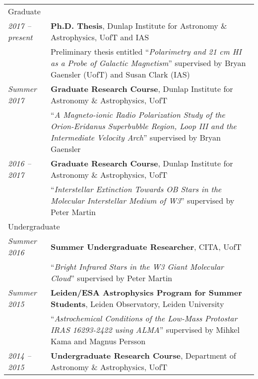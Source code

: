 \documentclass[10pt]{res} %
\begin{document}
\begin{resume}
\begin{table}[h]
\begin{tabularx}{\textwidth}{ @{} p{6.5em} X @{} }
\multicolumn{2}{l}{ \rule{0pt}{3ex} \large \hspace{-12pt} Graduate \dotfill \rule[-1.2ex]{0pt}{0pt}} \\
\textit{2017 -- present} & \textbf{Ph.D. Thesis}, Dunlap Institute for Astronomy \& Astrophysics, UofT and IAS \\
                                & Preliminary thesis entitled ``\textit{Polarimetry and 21 cm HI as a Probe of Galactic Magnetism}'' supervised by Bryan Gaensler (UofT) and Susan Clark (IAS) \\
\textit{Summer 2017} & \textbf{Graduate Research Course}, Dunlap Institute for Astronomy \& Astrophysics, UofT \\
                                   & ``\textit{A Magneto-ionic Radio Polarization Study of the Orion-Eridanus Superbubble Region, Loop III and the Intermediate Velocity Arch}'' supervised by Bryan Gaensler \\
\textit{2016 -- 2017} & \textbf{Graduate Research Course}, Dunlap Institute for Astronomy \& Astrophysics, UofT  \\
                                 & ``\textit{Interstellar Extinction Towards OB Stars in the Molecular Interstellar Medium of W3}'' supervised by Peter Martin \\
\multicolumn{2}{l}{ \rule{0pt}{6.5ex} \large \hspace{-12pt} Undergraduate \dotfill \rule[-1.2ex]{0pt}{0pt}} \\
\textit{Summer 2016} & \textbf{Summer Undergraduate Researcher}, CITA, UofT \\
                                 & ``\textit{Bright Infrared Stars in the W3 Giant Molecular Cloud}'' supervised by Peter Martin \\
\textit{Summer 2015} & \textbf{Leiden/ESA Astrophysics Program for Summer Students}, Leiden Observatory, Leiden University \\
                                 & ``\textit{Astrochemical Conditions of the Low-Mass Protostar IRAS 16293-2422 using ALMA}'' supervised by Mihkel Kama and Magnus Persson \\
\textit{2014 -- 2015} & \textbf{Undergraduate Research Course}, Department of Astronomy \& Astrophysics, UofT \\

\end{tabularx}
\end{table}
\end{resume}
\end{document}
